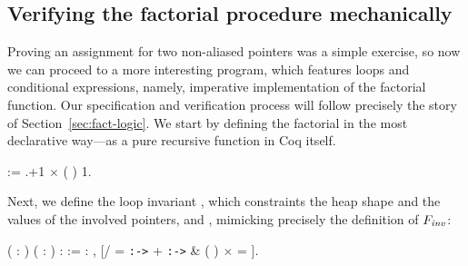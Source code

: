 \subsection{Verifying the factorial procedure mechanically}


\label{sec:factver}
Proving an assignment for two non-aliased pointers was a simple
exercise, so now we can proceed to a more interesting program, which
features loops and conditional expressions, namely, imperative
implementation of the factorial function.
Our specification and verification process will follow precisely the
story of Section~\ref{sec:fact-logic}. We start by defining the
factorial in the most declarative way---as a pure recursive function
in Coq itself.
\begin{coqdoccode}
\coqdocemptyline
\coqdocnoindent
{}   :=    .+1   \ensuremath{\times} ( )  1.\coqdoceol
\coqdocemptyline
\end{coqdoccode}


Next, we define the loop invariant , which constraints the
heap shape and the values of the involved pointers,  and ,
mimicking precisely the definition of $F_{\mathit{inv}}$:
\begin{coqdoccode}
\coqdocemptyline
\coqdocnoindent
{}  (  : ) ( : )  :  := \coqdoceol
\coqdocindent{1.00em}
  : , \coqdoceol
\coqdocindent{1.00em}
[/  =  \texttt{:->}  +  \texttt{:->}  \& \coqdoceol
\coqdocindent{3.00em}
( ) \ensuremath{\times}  =  ].\coqdoceol
\coqdocemptyline
\end{coqdoccode}


